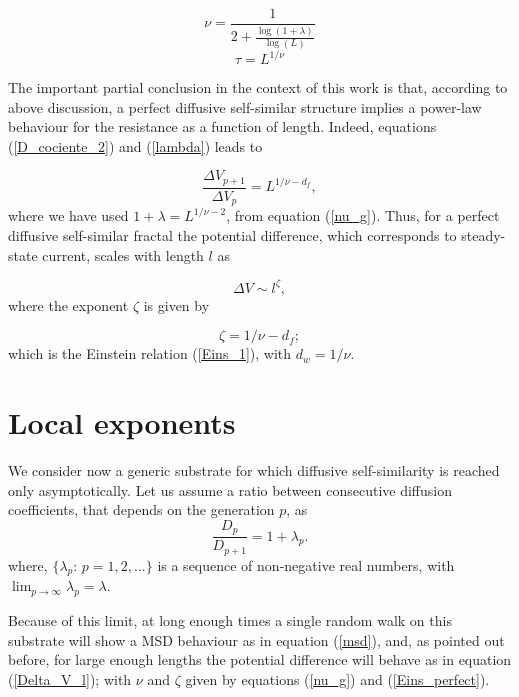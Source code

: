 \documentclass[12pt]{iopart}
\begin{document}
\begin{equation}
    \nu =\frac{\displaystyle 1}{\displaystyle 2+\frac{\displaystyle
    \log(1+\lambda)}{\displaystyle \log(L)}}
    \label{nu_g}
\end{equation}
\begin{equation}
      \tau = L^{1/\nu}
      \label{tau_l}
\end{equation}

The important partial conclusion in the context of this work
is that, 
according to above discussion, a perfect diffusive
self-similar structure implies  a power-law behaviour 
for the resistance as a function of length. Indeed, equations (\ref{D_cociente_2}) and (\ref{lambda}) leads to

\begin{equation}
  \frac{\Delta V_{p+1}}{\Delta V_{p}}=L^{1/\nu-d_f},
  \label{DeltaV}
\end{equation}
where we have used $1+\lambda=L^{1/\nu-2}$, from equation (\ref{nu_g}).
Thus, for a perfect diffusive self-similar fractal the
potential difference, which corresponds to steady-state
current, scales with length $l$ as

\begin{equation}
  \Delta V \sim l^\zeta,
  \label{Delta_V_l}
\end{equation}
where the exponent $\zeta$ is given by

\begin{equation}
    \zeta=1/\nu-d_f;
    \label{Eins_perfect}
\end{equation}
which is the Einstein relation (\ref{Eins_1}), with $d_w=1/\nu$.




\section{Local exponents}\label{sec:local}

We consider now a generic substrate for which diffusive self-similarity is reached
only asymptotically. Let us assume a ratio between
consecutive diffusion coefficients, that
depends on the generation $p$,  as
\begin{equation}
\frac{D_{p}}{D_{p+1}}=1+\lambda_p.
  \label{lambda_loc}
\end{equation}
where, $\{\lambda_p:\, p=1,2,...\}$ is a sequence of
non-negative real numbers, with  $\displaystyle \lim_{p\to\infty}\lambda_p =
\lambda$. 

Because of this limit, at long enough times a single random
walk on this substrate will show a MSD behaviour as in
equation (\ref{msd}), and, as pointed out before,
 for large enough lengths  the potential
difference will behave as in equation (\ref{Delta_V_l}); with $\nu$ and $\zeta$ given
by equations (\ref{nu_g}) and (\ref{Eins_perfect}).
\end{document}
